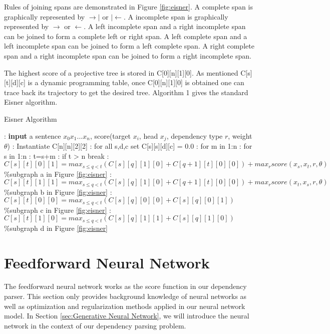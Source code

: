  Rules of joining spans are demonstrated in Figure \ref{fig:eisner}. A complete span is graphically represented by  $\rightarrow|$ or  $|\leftarrow$. A incomplete span is graphically represented by $\rightarrow$ or $\leftarrow$. A left incomplete span and a right incomplete span can be joined to form a complete left or right span. A left complete span and a left incomplete span can be joined to form a left complete span. A right complete span and a right incomplete span can be joined to form a right incomplete
span.

The highest score of a projective tree is stored in C[0][n][1][0]. As mentioned C[s][t][d][c] is a dynamic programming table, once C[0][n][1][0] is obtained one can trace back its trajectory to get the desired tree. Algorithm 1 \cite{kubler2009dependency} gives the standard Eisner algorithm. 
\begin{algorithm}
\caption{Eisner Algorithm}
\label{Algo1}
\begin{algorithmic}
: \textbf{input} a sentence $x_0 x_1...x_n$, score(target $x_i$, head $x_j$, dependency type $r$, weight $\theta$) 
: Instantiate C[n][n][2][2]
: for all s,d,c set C[s][s][d][c] = 0.0 
: for m in 1:n
:  \hspace{4mm}for s in 1:n
:  \hspace{6mm}t=s+m
:  \hspace{6mm}if t > n break
:  \hspace{6mm}$C[s][t][0][1]=max_{s\leq q<t}(C[s][q][1][0]+C[q+1][t][0][0])+max_r score(x_s,x_t,r,\theta)$
\STATE \hspace{8mm}\%subgraph a in Figure \ref{fig:eisner}
:  \hspace{6mm}$C[s][t][1][1]=max_{s\leq q<t}(C[s][q][1][0]+C[q+1][t][0][0])+max_r score(x_t,x_s,r,\theta)$
\STATE \hspace{8mm}\%subgraph b in Figure \ref{fig:eisner}
:  \hspace{6mm}$C[s][t][0][0]=max_{s\leq q<t}(C[s][q][0][0]+C[s][q][0][1])$
\STATE \hspace{8mm}\%subgraph c in Figure \ref{fig:eisner}
: \hspace{4.25mm}$C[s][t][1][0]=max_{s\leq q<t}(C[s][q][1][1]+C[s][q][1][0])$
\STATE \hspace{8mm}\%subgraph d in Figure \ref{fig:eisner}
\end{algorithmic}
\end{algorithm}


\section{Feedforward Neural Network}
\label{sec:Feedforward Neural Network}
The feedforward neural network works as the score function in our dependency parser. This section only provides background knowledge of neural networks as well as optimization and regularization methods applied in our neural network model. In Section \ref{sec:Generative Neural Network}, we will introduce the neural network in the context of our dependency parsing problem.


